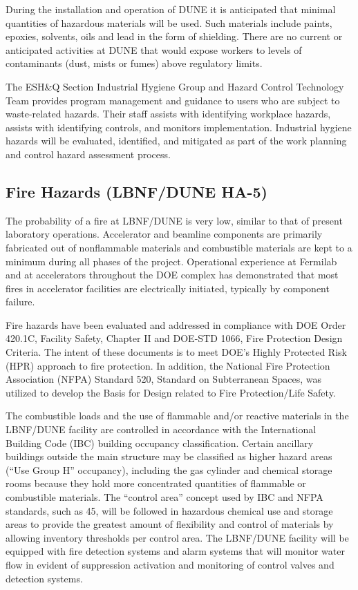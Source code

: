 During the installation and operation of DUNE it is anticipated that
minimal quantities of hazardous materials will be used. Such materials
include paints, epoxies, solvents, oils and lead in the form of
shielding. There are no current or anticipated activities at DUNE that
would expose workers to levels of contaminants (dust, mists or fumes)
above regulatory limits.

The ESH\&Q Section Industrial Hygiene Group and Hazard Control
Technology Team provides program management and guidance to users who
are subject to waste-related hazards.  Their staff assists with
identifying workplace hazards, assists with identifying controls, and
monitors implementation. Industrial hygiene hazards will be evaluated,
identified, and mitigated as part of the work planning and control
hazard assessment process.

\subsection{Fire Hazards (LBNF/DUNE HA-5)}

The probability of a fire at LBNF/DUNE is very low, similar to that of
present laboratory operations. Accelerator and beamline components are
primarily fabricated out of nonflammable materials and combustible
materials are kept to a minimum during all phases of the
project. Operational experience at Fermilab and at accelerators
throughout the DOE complex has demonstrated that most fires in
accelerator facilities are electrically initiated, typically by
component failure.

Fire hazards have been evaluated and addressed in compliance with DOE
Order 420.1C, Facility Safety, Chapter II and DOE-STD 1066, Fire
Protection Design Criteria.  The intent of these documents is to meet
DOE's Highly Protected Risk (HPR) approach to fire protection.  In
addition, the National Fire Protection Association (NFPA) Standard
520, Standard on Subterranean Spaces, was utilized to develop the
Basis for Design related to Fire Protection/Life Safety.

The combustible loads and the use of flammable and/or reactive
materials in the LBNF/DUNE facility are controlled in accordance with
the International Building Code (IBC) building occupancy
classification. Certain ancillary buildings outside the main structure
may be classified as higher hazard areas (``Use Group H'' occupancy),
including the gas cylinder and chemical storage rooms because they
hold more concentrated quantities of flammable or combustible
materials.  The ``control area'' concept used by IBC and NFPA standards,
such as 45, will be followed in hazardous chemical use and storage
areas to provide the greatest amount of flexibility and control of
materials by allowing inventory thresholds per control area.  The
LBNF/DUNE facility will be equipped with fire detection systems and
alarm systems that will monitor water flow in evident of suppression
activation and monitoring of control valves and detection systems.

